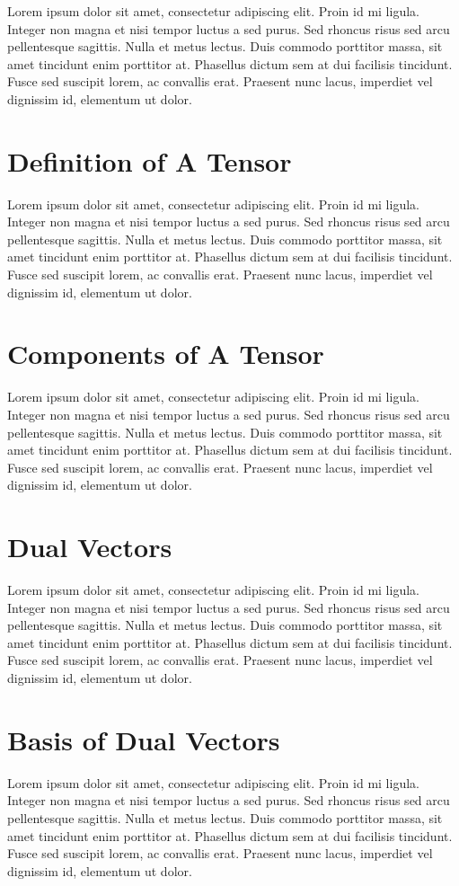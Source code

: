 \documentclass[natbib]{muthesis}
\begin{document}
  Lorem ipsum dolor sit amet, consectetur adipiscing elit. Proin id mi ligula. Integer non magna et nisi tempor luctus a sed purus. Sed rhoncus risus sed arcu pellentesque sagittis. Nulla et metus lectus. Duis commodo porttitor massa, sit amet tincidunt enim porttitor at. Phasellus dictum sem at dui facilisis tincidunt. Fusce sed suscipit lorem, ac convallis erat. Praesent nunc lacus, imperdiet vel dignissim id, elementum ut dolor.

  \section{Definition of A Tensor}
  Lorem ipsum dolor sit amet, consectetur adipiscing elit. Proin id mi ligula. Integer non magna et nisi tempor luctus a sed purus. Sed rhoncus risus sed arcu pellentesque sagittis. Nulla et metus lectus. Duis commodo porttitor massa, sit amet tincidunt enim porttitor at. Phasellus dictum sem at dui facilisis tincidunt. Fusce sed suscipit lorem, ac convallis erat. Praesent nunc lacus, imperdiet vel dignissim id, elementum ut dolor.


  \section{Components of A Tensor}
  Lorem ipsum dolor sit amet, consectetur adipiscing elit. Proin id mi ligula. Integer non magna et nisi tempor luctus a sed purus. Sed rhoncus risus sed arcu pellentesque sagittis. Nulla et metus lectus. Duis commodo porttitor massa, sit amet tincidunt enim porttitor at. Phasellus dictum sem at dui facilisis tincidunt. Fusce sed suscipit lorem, ac convallis erat. Praesent nunc lacus, imperdiet vel dignissim id, elementum ut dolor.

  \section{Dual Vectors}
  Lorem ipsum dolor sit amet, consectetur adipiscing elit. Proin id mi ligula. Integer non magna et nisi tempor luctus a sed purus. Sed rhoncus risus sed arcu pellentesque sagittis. Nulla et metus lectus. Duis commodo porttitor massa, sit amet tincidunt enim porttitor at. Phasellus dictum sem at dui facilisis tincidunt. Fusce sed suscipit lorem, ac convallis erat. Praesent nunc lacus, imperdiet vel dignissim id, elementum ut dolor.

  \section{Basis of Dual Vectors}
  Lorem ipsum dolor sit amet, consectetur adipiscing elit. Proin id mi ligula. Integer non magna et nisi tempor luctus a sed purus. Sed rhoncus risus sed arcu pellentesque sagittis. Nulla et metus lectus. Duis commodo porttitor massa, sit amet tincidunt enim porttitor at. Phasellus dictum sem at dui facilisis tincidunt. Fusce sed suscipit lorem, ac convallis erat. Praesent nunc lacus, imperdiet vel dignissim id, elementum ut dolor.
\end{document}
